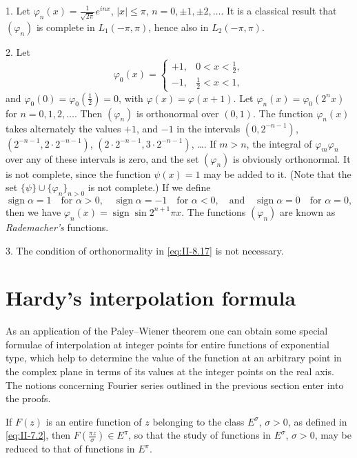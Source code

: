 \begin{remark}
1. Let $\varphi_{n}(x)=\frac{1}{\sqrt{2\pi}}e^{inx}$, $|x|\le\pi$, $n=0,\pm1,\pm2,\dots$. It is a classical result that $(\varphi_{n})$ is complete in $L_{1}(-\pi,\pi)$, hence also in $L_{2}(-\pi,\pi)$.

2. Let
\[
\varphi_{0}(x)=
\begin{cases}
+1, & 0<x<\frac{1}{2},\\
-1, & \frac{1}{2}<x<1,
\end{cases}
\]
and $\varphi_{0}(0)=\varphi_{0}(\frac{1}{2})=0$, with $\varphi(x)=\varphi(x+1)$. Let $\varphi_{n}(x)=\varphi_{0}(2^{n}x)$ for $n=0,1,2,\dots$. Then $(\varphi_{n})$ is orthonormal over $(0,1)$. The function $\varphi_{n}(x)$ takes alternately the values $+1$, and $-1$ in the intervals $(0,2^{-n-1})$, $(2^{-n-1},2\cdot2^{-n-1})$, $(2\cdot2^{-n-1},3\cdot2^{-n-1})$, \dots. If $m>n$, the integral of $\varphi_{m}\varphi_{n}$ over any of these intervals is zero, and the set $(\varphi_{n})$ is obviously orthonormal. It is not complete, since the function $\psi(x)=1$ may be added to it. (Note that the set $\{\psi\}\cup\{\varphi_{n}\}_{n>0}$ is not complete.) If we define
\[
\operatorname{sign}\alpha=1\quad\text{for }\alpha>0,\quad \operatorname{sign}\alpha=-1\quad\text{for }\alpha<0,\quad\text{and}\quad \operatorname{sign}\alpha=0\quad\text{for }\alpha=0,
\]
then we have $\varphi_{n}(x)=\operatorname{sign}\sin 2^{n+1}\pi x$. The functions $(\varphi_{n})$ are known as \emph{Rademacher's} functions.

3. The condition of orthonormality in \eqref{eq:II-8.17} is not necessary.
\end{remark}

\setcounter{section}{8}
\section{Hardy's interpolation formula}
\label{sec:II-9}

As an application of the Paley--Wiener theorem one can obtain some special formulae of interpolation at integer points for entire functions of exponential type, which help to determine the value of the function at an arbitrary point in the complex plane in terms of its values at the integer points on the real axis. The notions concerning Fourier series outlined in the previous section enter into the proofs.

If $F(z)$ is an entire function of $z$ belonging to the class $E^{\sigma}$, $\sigma>0$, as defined in \eqref{eq:II-7.2}, then $F(\frac{\pi z}{\sigma})\in E^{\pi}$, so that the study of functions in $E^{\sigma}$, $\sigma>0$, may be reduced to that of functions in $E^{\pi}$.

